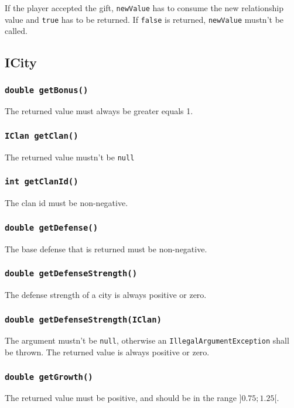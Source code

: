 \documentclass{article}
\begin{document}
If the player accepted the gift, \texttt{newValue} has to consume the new relationship value and
\texttt{true} has to be returned.
If \texttt{false} is returned, \texttt{newValue} mustn't be called.

\subsection{ICity}

\subsubsection{\texttt{double getBonus()}}
The returned value must always be greater equals 1.

\subsubsection{\texttt{IClan getClan()}}
The returned value mustn't be \texttt{null}

\subsubsection{\texttt{int getClanId()}}
The clan id must be non-negative.

\subsubsection{\texttt{double getDefense()}}
The base defense that is returned must be non-negative.

\subsubsection{\texttt{double getDefenseStrength()}}
The defense strength of a city is always positive or zero.

\subsubsection{\texttt{double getDefenseStrength(IClan)}}
The argument mustn't be \texttt{null}, otherwise an \texttt{IllegalArgumentException} shall be thrown.
The returned value is always positive or zero.

\subsubsection{\texttt{double getGrowth()}}
The returned value must be positive, and should be in the range $]0.75;1.25[$.
\end{document}
